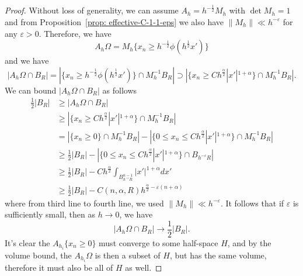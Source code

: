 \documentclass[12pt,reqno]{amsart}
\newcommand{\eps}{\varepsilon}
\numberwithin{equation}{section}
\begin{document}
    \begin{proof}
        Without loss of generality, we can assume $A_h = h^{-\frac 1 2}M_h$ with $\det M_h=1$ and from Proposition~\ref{prop: effective-C-1-1-eps} we also have $\|M_h\|\ll h^{-\eps}$ for any $\eps>0$. Therefore, we have
	\[A_h\Omega = M_h\{x_n\geq h^{-\frac 1 2}\phi(h^{\frac 1 2}x')\}\]
	and we have
	\[|A_h\Omega\cap B_R| = |\{x_n\geq h^{-\frac 1 2}\phi(h^{\frac 1 2}x')\}\cap M_h^{-1}B_R|\supset |\{x_n\geq Ch^{\frac{\alpha}{2}}|x'|^{1+\alpha}\}\cap M_h^{-1}B_R|.\]
    We can bound $|A_h\Omega\cap B_R|$ as follows
    \begin{align}
    \frac{1}{2}|B_R|&\geq |A_h\Omega\cap B_R|\\
    &\geq |\{x_n\geq Ch^{\frac{\alpha}{2}}|x'|^{1+\alpha}\}\cap M_h^{-1}B_R|\\
    &= |\{x_n\geq 0\}\cap M_h^{-1}B_R|-|\{0\leq x_n\leq Ch^{\frac{\alpha}{2}}|x'|^{1+\alpha}\}\cap M_h^{-1}B_R|\\
    &\geq \frac 1 2 |B_R|- |\{0\leq x_n\leq Ch^{\frac{\alpha}{2}}|x'|^{1+\alpha}\}\cap B_{h^{-\eps}R}|\\
    & \geq \frac 1 2 |B_R|-Ch^{\frac{\alpha}{2}}\int_{B_{h^{-\eps}R}^{n-1}}|x'|^{1+\alpha}dx'\\
    & \geq  \frac 1 2 |B_R|-C(n, \alpha, R)h^{\frac{\alpha}{2}-\eps(n+\alpha)}
    \end{align}
    where from third line to fourth line, we used $\|M_h\|\ll h^{-\eps}$. It follows that if $\eps$ is sufficiently small, then as $h\to 0$, we have
    \[|A_h\Omega\cap B_R|\to \frac 1 2 |B_R|. \]
    It's clear the $A_{h_i}\{x_n\geq 0\}$ must converge to some half-space $H$, and by the volume bound, the $A_{h_i}\Omega$ is then a subset of $H$, but has the same volume, therefore it must also be all of $H$ as well. 
    \end{proof}
\end{document}

